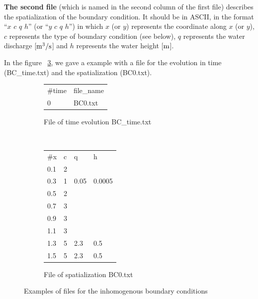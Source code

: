 \documentclass[a4paper, 11pt]{article}
\begin{document}
\noindent\textbf{The second file} (which is named in the second column of the first file) describes the spatialization of the boundary condition.
It should be in ASCII, in the format ``$x$ $c$ $q$ $h$'' (or ``$y$ $c$ $q$ $h$'') in which $x$ (or $y$) represents the coordinate along $x$ (or $y$), $c$ represents the
 type of boundary condition (see below), $q$ represents the water discharge [$\rm m^{3}/s$] and $h$ represents the water height [$\rm m$].

  In the figure ~\ref{Tab:BoundaryCondition}, we gave a example with a file for the evolution in time (BC\_time.txt) and the spatialization (BC0.txt).

  

  
\begin{figure}[htbp]
	\begin{subfigure}[b]{0.5\textwidth}
		\centering
		\begin{tt}
		\begin{tabular}{ll}
			\#time & file\_name\\
			0     & BC0.txt
		\end{tabular}
		\end{tt}
		\caption{File of time evolution BC\_time.txt\label{Fig:BoundaryCondition:a}}
  	\end{subfigure}
	~
	\begin{subfigure}[b]{0.5\textwidth}
		\centering
		\begin{tt}
		\begin{tabular}{llll}
			\#x & c & q    & h\\
			0.1 & 2 &  	   & \\
			0.3 & 1 & 0.05 & 0.0005\\
			0.5 & 2 &      & \\
			0.7 & 3 &      & \\
			0.9 & 3 &      & \\
			1.1 & 3 &      & \\
			1.3 & 5 & 2.3  & 0.5\\
			1.5 & 5 & 2.3  & 0.5\\
		\end{tabular}
		\end{tt}
		\caption{File of spatialization BC0.txt\label{Tab:BoundaryCondition:b}}
	\end{subfigure}
	\caption{Examples of files for the inhomogenous boundary conditions\label{Tab:BoundaryCondition}}
\end{figure}
\end{document}
